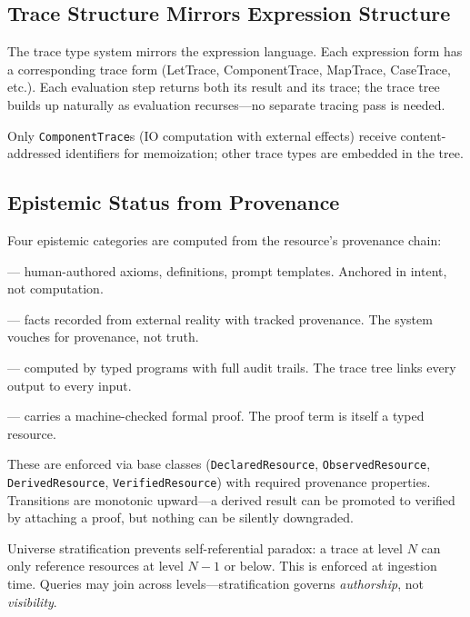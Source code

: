 \documentclass[10pt,twocolumn,letterpaper]{article}
\newcommand{\code}[1]{\texttt{\small #1}}
\begin{document}
\subsection{Trace Structure Mirrors Expression Structure}

The trace type system mirrors the expression language.
Each expression form has a corresponding trace form (LetTrace, ComponentTrace, MapTrace, CaseTrace, etc.).
Each evaluation step returns both its result and its trace; the trace tree builds up naturally as evaluation recurses---no separate tracing pass is needed.

Only \code{ComponentTrace}s (IO computation with external effects) receive content-addressed identifiers for memoization; other trace types are embedded in the tree.

\subsection{Epistemic Status from Provenance}

Four epistemic categories are computed from the resource's provenance chain:

\begin{description}[style=unboxed,leftmargin=0em]
  \item[Declared] --- human-authored axioms, definitions, prompt templates. Anchored in intent, not computation.
  \item[Observed] --- facts recorded from external reality with tracked provenance. The system vouches for provenance, not truth.
  \item[Derived] --- computed by typed programs with full audit trails. The trace tree links every output to every input.
  \item[Verified] --- carries a machine-checked formal proof. The proof term is itself a typed resource.
\end{description}

\noindent These are enforced via base classes (\code{DeclaredResource}, \code{ObservedResource}, \code{DerivedResource}, \code{VerifiedResource}) with required provenance properties.
Transitions are monotonic upward---a derived result can be promoted to verified by attaching a proof, but nothing can be silently downgraded.

Universe stratification prevents self-referential paradox: a trace at level $N$ can only reference resources at level $N{-}1$ or below.
This is enforced at ingestion time.
Queries may join across levels---stratification governs \emph{authorship}, not \emph{visibility}.
\end{document}
